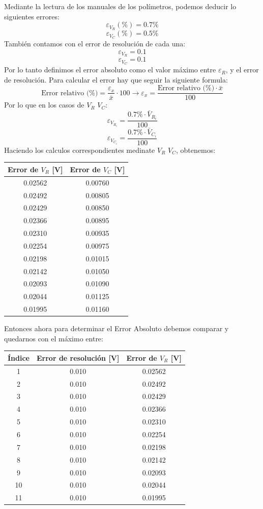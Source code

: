 \documentclass{article}
\begin{document}
Mediante la lectura de los manuales de los polímetros, podemos deducir lo siguientes errores:
\[
\varepsilon_{V_R}(\%) = 0.7\%
\]
\[
\varepsilon_{V_C}(\%) = 0.5\%
\]
También contamos con el error de resolución de cada una:
\[
\varepsilon_{V_R} = 0.1
\]
\[
\varepsilon_{V_C} = 0.1
\]
Por lo tanto definimos el error absoluto como el valor máximo entre $\varepsilon_R$, y el error de resolución.
\vspace{2em}
Para calcular el error hay que seguir la siguiente formula:
\[
\text{Error relativo (\%)} = \frac{\varepsilon_x}{\bar{x}} \cdot 100 \longrightarrow \varepsilon_x = \frac{\text{Error relativo (\%)} \cdot \bar{x}}{100}
\]
Por lo que en los casos de $V_R$ $V_C$:
\[
\varepsilon_{V_{R_i}} = \frac{0.7\% \cdot \bar{V}_{R_i}}{100}
\]
\[
\varepsilon_{V_{C_i}} = \frac{0.7\% \cdot \bar{V}_{C_i}}{100}
\]
Haciendo los calculos correspondientes medinate $V_R$ $V_C$, obtenemos:
\begin{table}[H]
	\centering
	\begin{tabular}{|c|c|}
		\hline
		\textbf{Error de $V_R$ [V]} & \textbf{Error de $V_C$ [V]} \\
		\hline
		0.02562 & 0.00760 \\
		0.02492 & 0.00805 \\
		0.02429 & 0.00850 \\
		0.02366 & 0.00895 \\
		0.02310 & 0.00935 \\
		0.02254 & 0.00975 \\
		0.02198 & 0.01015 \\
		0.02142 & 0.01050 \\
		0.02093 & 0.01090 \\
		0.02044 & 0.01125 \\
		0.01995 & 0.01160 \\
		\hline
	\end{tabular}

\end{table}
Entonces ahora para determinar el Error Absoluto debemos comparar y quedarnos con el máximo entre:
\begin{table}[H]
	\centering
	\begin{tabular}{|c|c|c|}
		\hline
		\textbf{Índice} & \textbf{Error de resolución [V]} & \textbf{Error de $V_R$ [V]} \\
		\hline
		1  & 0.010 & 0.02562 \\
		2  & 0.010 & 0.02492 \\
		3  & 0.010 & 0.02429 \\
		4  & 0.010 & 0.02366 \\
		5  & 0.010 & 0.02310 \\
		6  & 0.010 & 0.02254 \\
		7  & 0.010 & 0.02198 \\
		8  & 0.010 & 0.02142 \\
		9  & 0.010 & 0.02093 \\
		10 & 0.010 & 0.02044 \\
		11 & 0.010 & 0.01995 \\
		\hline
	\end{tabular}
\end{table}
\end{document}
